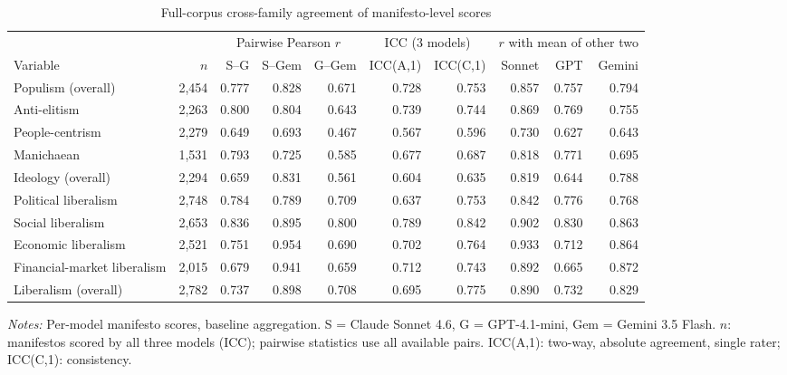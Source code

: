 \begin{table}[ht]
\centering
\caption{Full-corpus cross-family agreement of manifesto-level scores}
\label{tab:verify_crossmodel}
\scriptsize
\begin{tabular}{lrrrrrrrrr}
\toprule
 & & \multicolumn{3}{c}{Pairwise Pearson $r$} & \multicolumn{2}{c}{ICC (3 models)} & \multicolumn{3}{c}{$r$ with mean of other two} \\
\cmidrule(lr){3-5}\cmidrule(lr){6-7}\cmidrule(lr){8-10}
Variable & $n$ & S--G & S--Gem & G--Gem & ICC(A,1) & ICC(C,1) & Sonnet & GPT & Gemini \\
\midrule
Populism (overall) & 2{,}454 & 0.777 & 0.828 & 0.671 & 0.728 & 0.753 & 0.857 & 0.757 & 0.794 \\
Anti-elitism & 2{,}263 & 0.800 & 0.804 & 0.643 & 0.739 & 0.744 & 0.869 & 0.769 & 0.755 \\
People-centrism & 2{,}279 & 0.649 & 0.693 & 0.467 & 0.567 & 0.596 & 0.730 & 0.627 & 0.643 \\
Manichaean & 1{,}531 & 0.793 & 0.725 & 0.585 & 0.677 & 0.687 & 0.818 & 0.771 & 0.695 \\
Ideology (overall) & 2{,}294 & 0.659 & 0.831 & 0.561 & 0.604 & 0.635 & 0.819 & 0.644 & 0.788 \\
Political liberalism & 2{,}748 & 0.784 & 0.789 & 0.709 & 0.637 & 0.753 & 0.842 & 0.776 & 0.768 \\
Social liberalism & 2{,}653 & 0.836 & 0.895 & 0.800 & 0.789 & 0.842 & 0.902 & 0.830 & 0.863 \\
Economic liberalism & 2{,}521 & 0.751 & 0.954 & 0.690 & 0.702 & 0.764 & 0.933 & 0.712 & 0.864 \\
Financial-market liberalism & 2{,}015 & 0.679 & 0.941 & 0.659 & 0.712 & 0.743 & 0.892 & 0.665 & 0.872 \\
Liberalism (overall) & 2{,}782 & 0.737 & 0.898 & 0.708 & 0.695 & 0.775 & 0.890 & 0.732 & 0.829 \\
\bottomrule
\end{tabular}
\par\smallskip\parbox{0.95\linewidth}{\scriptsize\textit{Notes:} 
Per-model manifesto scores, baseline aggregation.
 S = Claude Sonnet 4.6, G = GPT-4.1-mini, Gem = Gemini 3.5 Flash. $n$: manifestos scored by all three models (ICC); pairwise statistics use all available pairs. ICC(A,1): two-way, absolute agreement, single rater; ICC(C,1): consistency.}
\end{table}
